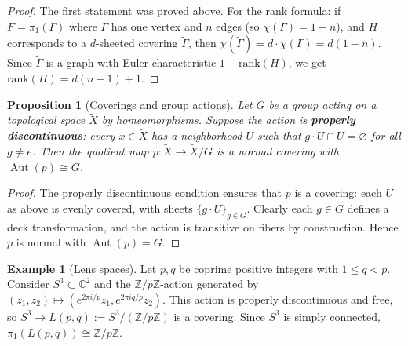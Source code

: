 \documentclass[12pt,a4paper,openany]{book}
\theoremstyle{definition}
\newtheorem{example}[definition]{Example}
\theoremstyle{plain}
\newtheorem{proposition}[definition]{Proposition}
\theoremstyle{remark}
\newcommand{\Z}{\mathbb{Z}}
\newcommand{\C}{\mathbb{C}}
\DeclareMathOperator{\Aut}{Aut}
\begin{document}
\begin{proof}
  The first statement was proved above.  For the rank formula: if $F =
  \pi_1(\Gamma)$ where $\Gamma$ has one vertex and $n$ edges (so
  $\chi(\Gamma) = 1 - n$), and $H$ corresponds to a $d$-sheeted covering
  $\widetilde{\Gamma}$, then $\chi(\widetilde{\Gamma}) = d \cdot
  \chi(\Gamma) = d(1-n)$.  Since $\widetilde{\Gamma}$ is a graph with
  Euler characteristic $1 - \mathrm{rank}(H)$, we get
  $\mathrm{rank}(H) = d(n-1) + 1$.
\end{proof}

\begin{proposition}[Coverings and group actions]\label{prop:covering-group-action}
  Let $G$ be a group acting on a topological space $\widetilde{X}$ by
  homeomorphisms.  Suppose the action is \textbf{properly discontinuous}:
  every $\tilde{x} \in \widetilde{X}$ has a neighborhood $U$ such that
  $g \cdot U \cap U = \varnothing$ for all $g \neq e$.  Then the quotient map
  $p\colon \widetilde{X} \to \widetilde{X}/G$ is a normal covering with
  $\Aut(p) \cong G$.
\end{proposition}

\begin{proof}
  The properly discontinuous condition ensures that $p$ is a covering: each
  $U$ as above is evenly covered, with sheets $\{g \cdot U\}_{g \in G}$.
  Clearly each $g \in G$ defines a deck transformation, and the action is
  transitive on fibers by construction.  Hence $p$ is normal with
  $\Aut(p) = G$.
\end{proof}

\begin{example}[Lens spaces]\label{ex:lens-spaces}
  Let $p, q$ be coprime positive integers with $1 \leq q < p$.  Consider
  $S^3 \subset \C^2$ and the $\Z/p\Z$-action generated by
  $(z_1, z_2) \mapsto (e^{2\pi i/p} z_1, e^{2\pi i q/p} z_2)$.  This action
  is properly discontinuous and free, so $S^3 \to L(p,q) := S^3/(\Z/p\Z)$ is
  a covering.  Since $S^3$ is simply connected,
  $\pi_1(L(p,q)) \cong \Z/p\Z$.
\end{example}
\end{document}
